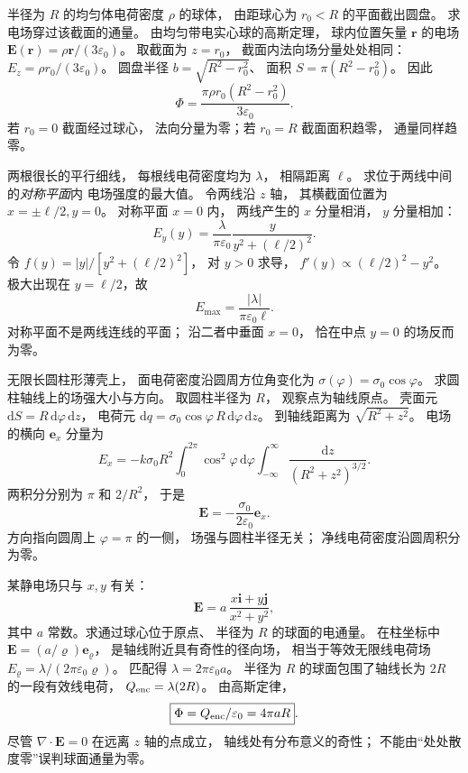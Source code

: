 半径为 $R$ 的均匀体电荷密度
$\rho$ 的球体，
由距球心为 $r_0<R$ 的平面截出圆盘。
求电场穿过该截面的通量。
\exsolution
由均匀带电实心球的高斯定理，
球内位置矢量 $\bm r$ 的电场
$\bm E(\bm r)=\rho\bm r/(3\varepsilon_0)$。
取截面为 $z=r_0$，
截面内法向场分量处处相同：
$E_z=\rho r_0/(3\varepsilon_0)$。
圆盘半径
$b=\sqrt{R^2-r_0^2}$、
面积 $S=\pi(R^2-r_0^2)$。
因此
\[
\boxed{\Phi=
\frac{\pi\rho r_0(R^2-r_0^2)}{3\varepsilon_0}}.
\]
\excheck 若 $r_0=0$ 截面经过球心，
法向分量为零；若 $r_0=R$ 截面面积趋零，
通量同样趋零。

两根很长的平行细线，
每根线电荷密度均为 $\lambda$，
相隔距离 $\ell$。
求位于两线中间的\emph{对称平面}内
电场强度的最大值。
\exsolution
令两线沿 $z$ 轴，
其横截面位置为
$x=\pm\ell/2,y=0$。
对称平面 $x=0$ 内，
两线产生的 $x$ 分量相消，
$y$ 分量相加：
\[
E_y(y)=
\frac{\lambda}{\pi\varepsilon_0}
\frac{y}{y^2+(\ell/2)^2}.
\]
令
$f(y)=|y|/[y^2+(\ell/2)^2]$，
对 $y>0$ 求导，
$f'(y)\propto(\ell/2)^2-y^2$。
极大出现在 $y=\ell/2$，故
\[
\boxed{E_{\max}=\frac{|\lambda|}{\pi\varepsilon_0\ell}}.
\]
\excheck 对称平面不是两线连线的平面；
沿二者中垂面 $x=0$，
恰在中点 $y=0$ 的场反而为零。

无限长圆柱形薄壳上，
面电荷密度沿圆周方位角变化为
$\sigma(\varphi)=\sigma_0\cos\varphi$。
求圆柱轴线上的场强大小与方向。
\exsolution
取圆柱半径为 $R$，
观察点为轴线原点。
壳面元
$\mathrm dS=R\,\mathrm d\varphi\,\mathrm dz$，
电荷元
$\mathrm dq=\sigma_0\cos\varphi\,
R\,\mathrm d\varphi\,\mathrm dz$。
到轴线距离为
$\sqrt{R^2+z^2}$。
电场的横向 $\bm e_x$ 分量为
\[
E_x=-k\sigma_0 R^2
\int_0^{2\pi}\cos^2\varphi\,\mathrm d\varphi
\int_{-\infty}^{\infty}
\frac{\mathrm dz}{(R^2+z^2)^{3/2}}.
\]
两积分分别为 $\pi$ 和 $2/R^2$，
于是
\[
\boxed{\bm E=-\frac{\sigma_0}{2\varepsilon_0}\bm e_x}.
\]
\excheck 方向指向圆周上 $\varphi=\pi$ 的一侧，
场强与圆柱半径无关；
净线电荷密度沿圆周积分为零。

某静电场只与 $x,y$ 有关：
\[
\bm E=a\,\frac{x\bm i+y\bm j}{x^2+y^2},
\]
其中 $a$ 常数。求通过球心位于原点、
半径为 $R$ 的球面的电通量。
\exsolution
在柱坐标中
$\bm E=(a/\varrho)\bm e_\varrho$，
是轴线附近具有奇性的径向场，
相当于等效无限线电荷场
$E_\varrho=\lambda/(2\pi\varepsilon_0\varrho)$。
匹配得 $\lambda=2\pi\varepsilon_0a$。
半径为 $R$ 的球面包围了轴线长为 $2R$
的一段有效线电荷，
$Q_{\rm enc}=\lambda(2R)$。
由高斯定律，
\[
\boxed{\Phi=Q_{\rm enc}/\varepsilon_0=4\pi aR}.
\]
\excheck 尽管 $\nabla\cdot\bm E=0$
在远离 $z$ 轴的点成立，
轴线处有分布意义的奇性；
不能由“处处散度零”误判球面通量为零。

